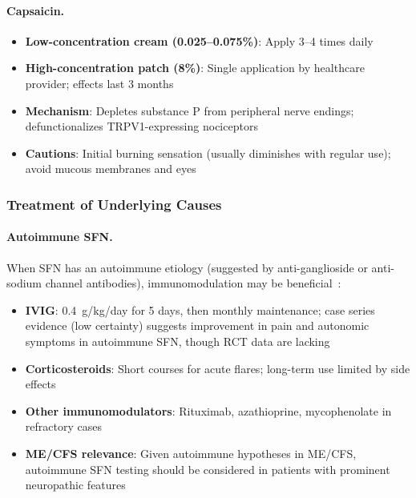 \paragraph{Capsaicin.}
\begin{itemize}
    \item \textbf{Low-concentration cream (0.025--0.075\%)}: Apply 3--4 times daily
    \item \textbf{High-concentration patch (8\%)}: Single application by healthcare provider; effects last 3 months
    \item \textbf{Mechanism}: Depletes substance P from peripheral nerve endings; defunctionalizes TRPV1-expressing nociceptors
    \item \textbf{Cautions}: Initial burning sensation (usually diminishes with regular use); avoid mucous membranes and eyes
\end{itemize}

\subsubsection{Treatment of Underlying Causes}

\paragraph{Autoimmune SFN.}
When SFN has an autoimmune etiology (suggested by anti-ganglioside or anti-sodium channel antibodies), immunomodulation may be beneficial~\cite{Oaklander2016autoimmuneSFN}:

\begin{itemize}
    \item \textbf{IVIG}: 0.4~g/kg/day for 5 days, then monthly maintenance; case series evidence (low certainty) suggests improvement in pain and autonomic symptoms in autoimmune SFN, though RCT data are lacking~\cite{Liu2020IVIG}
    \item \textbf{Corticosteroids}: Short courses for acute flares; long-term use limited by side effects
    \item \textbf{Other immunomodulators}: Rituximab, azathioprine, mycophenolate in refractory cases
    \item \textbf{ME/CFS relevance}: Given autoimmune hypotheses in ME/CFS, autoimmune SFN testing should be considered in patients with prominent neuropathic features
\end{itemize}

